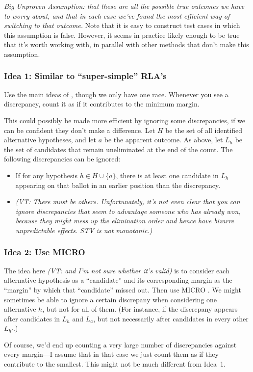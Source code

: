 \documentclass[10pt,a4paper]{article}
\newcommand{\VTNote}[1]{{\it(VT: #1)}}
\begin{document}
\emph{Big Unproven Assumption: that these are all the possible true outcomes we have to worry about, and that in each case we've found the most efficient way of switching to that outcome.}  Note that it is easy to construct test cases in which this assumption is false.  However, it seems in practice likely enough to be true that it's worth working with, in parallel with other methods that don't make this assumption.

\subsubsection{Idea 1: Similar to ``super-simple'' RLA's}
Use the main ideas of \cite{stark2010super}, though we only have one race.  Whenever you see a discrepancy, count it as if it contributes to the minimum margin.

This could possibly be made more efficient by ignoring some discrepancies, if we can be confident they don't make a difference.
Let $H$ be the set of all identified alternative hypotheses, and let $a$ be the apparent outcome.  As above, let $L_h$ be the set of candidates that remain uneliminated at the end of the count.  The following discrepancies can be ignored:
\begin{itemize}
\item If for any hypothesis $h \in H \cup \{a \}$, there is at least one candidate in $L_h$ appearing on that ballot in an earlier position than the discrepancy.
\item \VTNote{There must be others.  Unfortunately, it's not even clear that you can ignore discrepancies that seem to advantage someone who has already won, because they might mess up the elimination order and hence have bizarre unpredictable effects.  STV is not monotonic.}
\end{itemize}



\subsubsection{Idea 2: Use MICRO}
The idea here \VTNote{ and I'm not sure whether it's valid} is to consider each alternative hypothesis as a ``candidate'' and its corresponding margin as the ``margin'' by which that ``candidate'' missed out.  Then use MICRO \cite{stark2008sharper}.  We might sometimes be able to ignore a certain discrepany when considering one alternative $h$, but not for all of them.  (For instance, if the discrepany appears after candidates in $L_h$ and $L_a$, but not necessarily after candidates in every other $L_{h'}$.)  

Of course, we'd end up counting a very large number of discrepancies against every margin---I assume that in that case we just count them as if they contribute to the smallest.  This might not be much different from Idea~1. 



\end{document}
